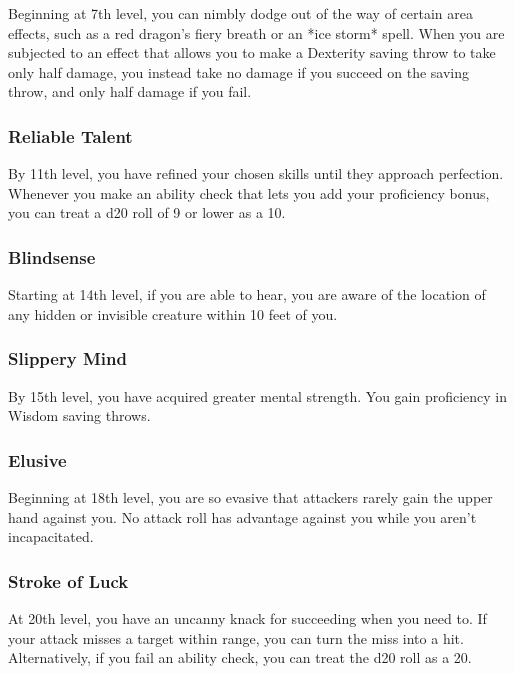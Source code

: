 Beginning at 7th level, you can nimbly dodge out of the way of certain area effects, such as a red dragon's fiery breath or an *ice storm* spell. When you are subjected to an effect that allows you to make a Dexterity saving throw to take only half damage, you instead take no damage if you succeed on the saving throw, and only half damage if you fail.

\subsubsection{Reliable Talent}

By 11th level, you have refined your chosen skills until they approach perfection. Whenever you make an ability check that lets you add your proficiency bonus, you can treat a d20 roll of 9 or lower as a 10.

\subsubsection{Blindsense}

Starting at 14th level, if you are able to hear, you are aware of the location of any hidden or invisible creature within 10 feet of you.

\subsubsection{Slippery Mind}

By 15th level, you have acquired greater mental strength. You gain proficiency in Wisdom saving throws.

\subsubsection{Elusive}

Beginning at 18th level, you are so evasive that attackers rarely gain the upper hand against you. No attack roll has advantage against you while you aren't incapacitated.

\subsubsection{Stroke of Luck}

At 20th level, you have an uncanny knack for succeeding when you need to. If your attack misses a target within range, you can turn the miss into a hit. Alternatively, if you fail an ability check, you can treat the d20 roll as a 20.

